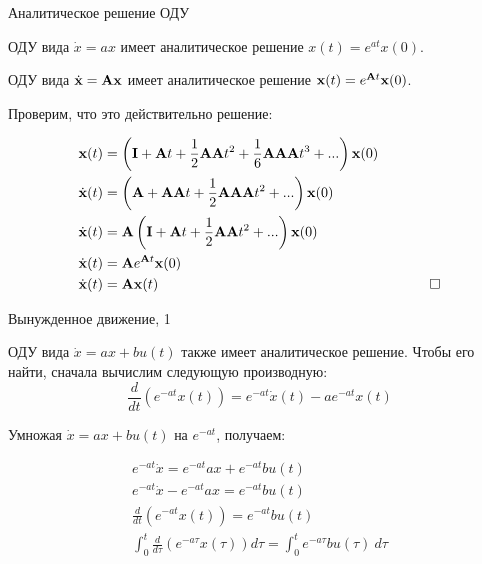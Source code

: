 \documentclass{beamer}
\begin{document}
\begin{frame}{Аналитическое решение ОДУ}
	\begin{flushleft}
		
		ОДУ вида $\dot x = a x$ имеет аналитическое решение $x(t) = e^{at} x(0)$.
		
		\bigskip
		
		ОДУ вида $\dot{\mathbf{x}} = \mathbf{A}  \mathbf{x}$ имеет аналитическое решение $\mathbf{x}(t) = e^{\mathbf{A}t}  \mathbf{x}(0)$.
		
		\bigskip
		
		Проверим, что это действительно решение:
		
		\begin{align}
			\mathbf{x}(t) &= \left( \mathbf{I}+\mathbf{A}t+\frac{1}{2} \mathbf{A}\mathbf{A}t^2
			+\frac{1}{6} \mathbf{A}\mathbf{A}\mathbf{A}t^3 + ... \right)  \mathbf{x}(0) &
			\\
			\dot{\mathbf{x}}(t) &= \left( \mathbf{A}+\mathbf{A}\mathbf{A}t
			+\frac{1}{2}\mathbf{A}\mathbf{A}\mathbf{A}t^2 + ... \right)  \mathbf{x}(0) 	&		
			\\
			\dot{\mathbf{x}}(t) &= \mathbf{A} \left(\mathbf{I} +\mathbf{A}t
			+\frac{1}{2}\mathbf{A}\mathbf{A}t^2 + ... \right)  \mathbf{x}(0) 	&		
			\\
			\dot{\mathbf{x}}(t) &= \mathbf{A} e^{\mathbf{A}t}  \mathbf{x}(0) 	&		 			
			\\
			\dot{\mathbf{x}}(t) &= \mathbf{A} \mathbf{x}(t)  &\ \ \qed
		\end{align}
		
	\end{flushleft}
\end{frame}

\begin{frame}{Вынужденное движение, 1}
	\begin{flushleft}
		
		ОДУ вида $\dot x = a x + bu(t)$ также имеет аналитическое решение. Чтобы его найти, сначала вычислим следующую производную:
		\begin{equation}
			\frac{d}{dt} \left( e^{-at} x(t) \right) = e^{-at} \dot x(t) - a e^{-at} x(t)
		\end{equation}
		
		Умножая $\dot x = a x + bu(t)$ на $e^{-at}$, получаем:
		
		\begin{align}
			e^{-at} \dot x = e^{-at} a x + e^{-at} bu(t)
			\\
			e^{-at} \dot x -  e^{-at} a x = e^{-at} bu(t)
			\\
			\frac{d}{dt} \left( e^{-at} x(t) \right) = e^{-at} bu(t)
			\\
			\int_{0}^{t} \frac{d}{d\tau} \left( e^{-a\tau} x(\tau) \right)  d\tau = 	\int_{0}^{t}  e^{-a\tau} bu(\tau) \ d\tau
		\end{align}
		
	\end{flushleft}
\end{frame}
\end{document}
